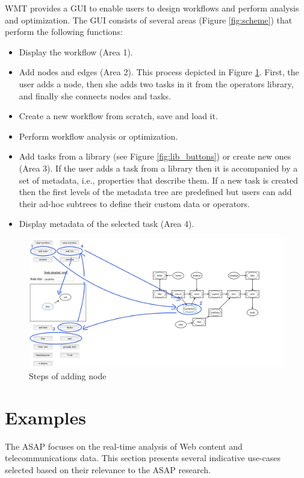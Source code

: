 \documentclass[12pt,openany,onecolumn]{book}
\begin{document}
WMT provides a GUI to enable users to design workflows and perform analysis and optimization.
The GUI consists of several areas (Figure \ref{fig:scheme}) that perform the following functions:
\begin{itemize}
\item Display the workflow (Area 1).
\item Add nodes and edges (Area 2). This process depicted in Figure \ref{fig:steps}. First, the user adds a node, then she adds two tasks in it from the operators library, and finally she connects nodes and tasks.
\item Create a new workflow from scratch, save and load it.
\item Perform workflow analysis or optimization.
\item Add tasks from a library (see Figure \ref{fig:lib_buttons}) or create new ones (Area 3). If the user adds a task from a library then it is accompanied by a set of metadata, i.e., properties that describe them. If a new task is created then the first levels of the metadata tree are predefined but users can add their ad-hoc subtrees to define their custom data or operators.
\item Display metadata of the selected task (Area 4).
\end{itemize}

\begin{figure}[h]
\centering
\includegraphics[width=\linewidth]{figs/steps.png}
\caption{Steps of adding node}\label{fig:steps}
\end{figure}

\section{Examples}\label{sec:examples}
The ASAP focuses on the real-time analysis of Web content and telecommunications data. This section presents several indicative use-cases selected based on their relevance to the ASAP research.
\end{document}
